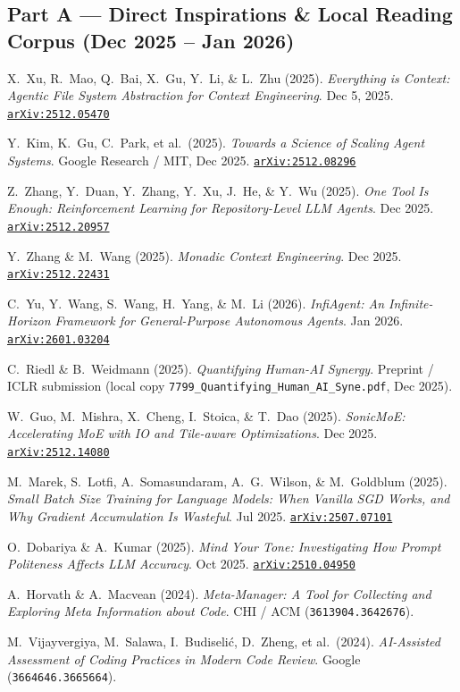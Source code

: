 \documentclass[10pt,letterpaper]{article}
\newcommand{\code}[1]{\texttt{\color{InkNavy}#1}}
\newcommand{\arxiv}[1]{\href{https://arxiv.org/abs/#1}{\code{arXiv:#1}}}
\begin{document}
\subsection*{Part A --- Direct Inspirations \& Local Reading Corpus (Dec 2025 -- Jan 2026)}
\footnotesize
\begin{enumerate}[label={[\arabic*]}, leftmargin=2.2em, itemsep=1.1pt]
\raggedright
  \item X.\ Xu, R.\ Mao, Q.\ Bai, X.\ Gu, Y.\ Li, \& L.\ Zhu (2025). \emph{Everything is Context: Agentic File System Abstraction for Context Engineering}. Dec 5, 2025. \arxiv{2512.05470}
  \item Y.\ Kim, K.\ Gu, C.\ Park, et al.\ (2025). \emph{Towards a Science of Scaling Agent Systems}. Google Research / MIT, Dec 2025. \arxiv{2512.08296}
  \item Z.\ Zhang, Y.\ Duan, Y.\ Zhang, Y.\ Xu, J.\ He, \& Y.\ Wu (2025). \emph{One Tool Is Enough: Reinforcement Learning for Repository-Level LLM Agents}. Dec 2025. \arxiv{2512.20957}
  \item Y.\ Zhang \& M.\ Wang (2025). \emph{Monadic Context Engineering}. Dec 2025. \arxiv{2512.22431}
  \item C.\ Yu, Y.\ Wang, S.\ Wang, H.\ Yang, \& M.\ Li (2026). \emph{InfiAgent: An Infinite-Horizon Framework for General-Purpose Autonomous Agents}. Jan 2026. \arxiv{2601.03204}
  \item C.\ Riedl \& B.\ Weidmann (2025). \emph{Quantifying Human-AI Synergy}. Preprint / ICLR submission (local copy \code{7799\_Quantifying\_Human\_AI\_Syne.pdf}, Dec 2025).
  \item W.\ Guo, M.\ Mishra, X.\ Cheng, I.\ Stoica, \& T.\ Dao (2025). \emph{SonicMoE: Accelerating MoE with IO and Tile-aware Optimizations}. Dec 2025. \arxiv{2512.14080}
  \item M.\ Marek, S.\ Lotfi, A.\ Somasundaram, A.\ G.\ Wilson, \& M.\ Goldblum (2025). \emph{Small Batch Size Training for Language Models: When Vanilla SGD Works, and Why Gradient Accumulation Is Wasteful}. Jul 2025. \arxiv{2507.07101}
  \item O.\ Dobariya \& A.\ Kumar (2025). \emph{Mind Your Tone: Investigating How Prompt Politeness Affects LLM Accuracy}. Oct 2025. \arxiv{2510.04950}
  \item A.\ Horvath \& A.\ Macvean (2024). \emph{Meta-Manager: A Tool for Collecting and Exploring Meta Information about Code}. CHI / ACM (\code{3613904.3642676}).
  \item M.\ Vijayvergiya, M.\ Salawa, I.\ Budiseli\'{c}, D.\ Zheng, et al.\ (2024). \emph{AI-Assisted Assessment of Coding Practices in Modern Code Review}. Google (\code{3664646.3665664}).

\end{enumerate}
\end{document}
